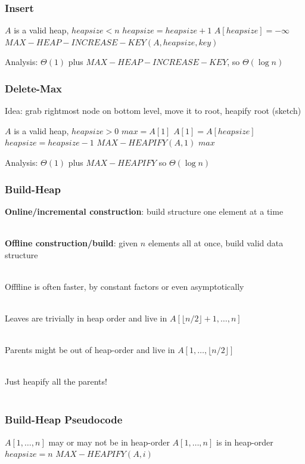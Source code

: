 \documentclass{beamer}
\newcommand{\stanza}{ \\~\ }
\begin{document}
\begin{frame} \frametitle{Insert}
\begin{algorithmic}[1]
  \Require $A$ is a valid heap, $heapsize < n$
  \State $heapsize = heapsize + 1$
  \State $A[heapsize] = - \infty$
  \State $MAX-HEAP-INCREASE-KEY(A, heapsize, key)$
  \EndFunction
\end{algorithmic}

Analysis: $\Theta(1)$ plus $MAX-HEAP-INCREASE-KEY$, so $\Theta(\log n)$
\end{frame}

\begin{frame} \frametitle{Delete-Max}

Idea: grab rightmost node on bottom level, move it to root, heapify root (sketch)

\begin{algorithmic}[1]
  \Require $A$ is a valid heap, $heapsize > 0$
  \State $max = A[1]$
  \State $A[1] = A[heapsize]$
  \State $heapsize = heapsize - 1$
  \State $MAX-HEAPIFY(A, 1)$
  \State \Return $max$
  \EndFunction
\end{algorithmic}

Analysis: $\Theta(1)$ plus $MAX-HEAPIFY$ so $\Theta(\log n)$
\end{frame}

\begin{frame} \frametitle{Build-Heap}
\textbf{Online/incremental construction}: build structure one element at a time \stanza

\textbf{Offline construction/build}: given $n$ elements all at once, build valid data structure \stanza

Offfline is often faster, by constant factors or even asymptotically \stanza

Leaves are trivially in heap order and live in $A[\lfloor n/2 \rfloor+1, \ldots, n]$ \stanza

Parents might be out of heap-order and live in $A[1, \ldots, \lfloor n/2 \rfloor]$ \stanza

Just heapify all the parents! \stanza
\end{frame}

\begin{frame} \frametitle{Build-Heap Pseudocode}
  \begin{algorithmic}[1]
    \Require $A[1, \ldots, n]$ may or may not be in heap-order
    \Ensure $A[1, \ldots, n]$ is in heap-order
    \State $heapsize = n$
      \State $MAX-HEAPIFY(A, i)$
    \EndFor
    \EndFunction
  \end{algorithmic}
\end{frame}
\end{document}

